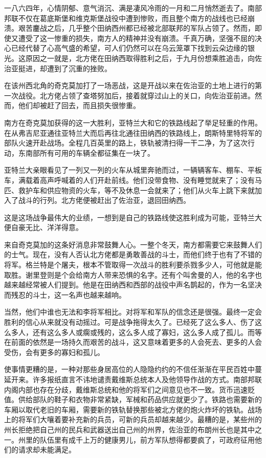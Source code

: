 \par 一八六四年，心情阴郁、意气消沉、满是凄风冷雨的一月和二月悄然逝去了。南部邦联不仅在葛底斯堡和维克斯堡战役中遭到惨败，而且整个南方的战线也已经崩溃。艰苦鏖战之后，几乎整个田纳西州都已经被北部联邦的军队占领了。然而，即使又遭受了这一惨重的损失，南方人的精神并没有崩溃。千真万确，坚强不屈的决心已经代替了心高气盛的希望，可人们仍然可以在乌云笼罩下找到云朵边缘的银光。这原因之一就是，北方佬在田纳西取得胜利之后，于九月份想乘胜追击，向佐治亚挺进，却遭到了沉重的挫败。
\par 在该州西北角的奇克莫加打了一场恶战，这是开战以来在佐治亚的土地上进行的第一次战役。北方佬占领了查塔努加后，接着就穿过山上的关口，向佐治亚前进。然而，他们却被赶了回去，而且损失很惨重。
\par 南方在奇克莫加获得的这一大胜利，亚特兰大和它的铁路线起了举足轻重的作用。在从弗吉尼亚通往亚特兰大而后再往北通往田纳西的铁路线上，朗斯特里特将军的部队火速开赴战场。全程几百英里的路上，铁轨被清扫得一干二净，为了这次行动，东南部所有可用的车辆全都征集在一块了。
\par 亚特兰大亲眼看见了一列又一列的火车从城里奔驰而过，一辆辆客车、棚车、平板车，满载着高声呼喊着的人们开赴前线。他们没带食物、没有睡觉就来了；没有马匹、救护车和供应物资的火车，等不及休息一会就来了；他们从火车上跳下来就加入了战斗的行列。北方佬便被赶出了佐治亚，退回田纳西。
\par 这是这场战争最伟大的业绩，一想到是自己的铁路线使这胜利成为可能，亚特兰大便自豪无比、洋洋得意。
\par 来自奇克莫加的这条好消息非常鼓舞人心。一整个冬天，南方都需要它来鼓舞人们的士气。现在，没有人否认北方佬都是勇敢善战的斗士，而他们终于也有了不错的将军。格兰特是个屠夫，根本不管取得一次战斗的胜利要杀戮多少人，可他就是能取胜。谢里登则是个会给南方人带来恐惧的名字。还有个叫舍曼的人，他的名字也越来越经常被人们提到。他是在田纳西和西部的战役中声名鹊起的，作为一名坚决而残忍的斗士，这一名声也越来越响。
\par 当然，他们中谁也无法和李将军相比。对将军和军队的信念还是很强。最终一定会胜利的信心从来就没有动摇过。可是战争拖得太久了。已经死了这么多人、伤了这么多人，还有这么多人或瘸或残的，这么多人成了寡妇，这么多人成了孤儿。而等在前面的依然是一场持久而艰苦的战斗，这又意味着更多的人会死去、更多的人会受伤，会有更多的寡妇和孤儿。
\par 使事情更糟的是，一种对那些身居高位的人隐隐约约的不信任渐渐在平民百姓中蔓延开来。许多报纸直言不讳地谴责戴维斯总统本人及他领导作战的方式。南部邦联内阁内部也存在分歧，戴维斯总统和他的将军们之间意见也不一致。货币迅速贬值。供给部队的鞋子和衣物非常紧缺，军械和药品供应就更少了。铁路也需要新的车厢以取代老旧的车厢，需要新的铁轨替换那些被北方佬的炮火炸坏的铁轨。战场上的将军们大嚷着要补充新的兵员，可新的兵员却越来越少。最糟的是，某些州的州长拒绝把自己州的民兵和武器送出自己州的州界，佐治亚的布朗州长也是其中之一。州里的队伍里有成千上万的健康男儿，前方军队想得都要疯了，可政府征用他们的请求却未能满足。
